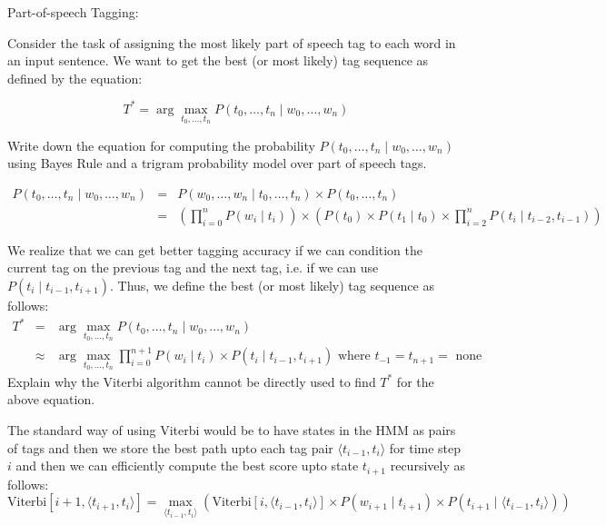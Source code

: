 \documentclass[11pt]{article}
\begin{document}
\begin{exe}
\begin{xlist}
\end{xlist}

\bigskip

\ex\label{trigram} Part-of-speech Tagging:

Consider the task of assigning the most
likely part of speech tag to each word in an input sentence. We want
to get the best (or most likely) tag sequence as defined by the
equation:

\[ T^\ast = \arg\max_{t_0, \ldots, t_n} P(t_0, \ldots, t_n \mid w_0,
\ldots, w_n) \]

\begin{xlist}

{\ex 
Write down the equation for computing the probability $P(t_0, \ldots,
t_n \mid w_0, \ldots, w_n)$ using Bayes Rule and a 
trigram probability model over part of speech tags.

\begin{soln}
 \begin{eqnarray}
 P(t_0, \ldots, t_n \mid w_0, \ldots, w_n) &=& P(w_0, \ldots, w_n \mid
 t_0, \ldots, t_n) \times P(t_0, \ldots, t_n) \nonumber \\
 &=& \left( \prod_{i=0}^n P(w_i \mid t_i) \right) \times
      \left( P(t_0) \times P(t_1 \mid t_0) \times
        \prod_{i=2}^n P(t_i \mid t_{i-2}, t_{i-1}) \right)
      \nonumber
 \end{eqnarray}
\end{soln}
}

\bigskip

{\ex 
We realize that we can get better tagging accuracy if we can condition the current tag on
the previous tag and the next tag, i.e. if we can use $P(t_i \mid t_{i-1}, t_{i+1})$. 
Thus, we define the best (or most likely) tag sequence 
as follows:
\begin{eqnarray*}
T^\ast &=& \arg\max_{t_0, \ldots, t_n} P(t_0, \ldots, t_n \mid w_0,
\ldots, w_n) \\
&\approx& \arg\max_{t_0, \ldots, t_n} \prod_{i=0}^{n+1} P(w_i \mid t_i) \times P(t_i \mid t_{i-1}, t_{i+1})
\textrm{ where $t_{-1} = t_{n+1} = $ none }
\end{eqnarray*}
Explain why the Viterbi algorithm cannot be directly used to find $T^\ast$ for the above equation.

\begin{soln}
The standard way of using Viterbi would be to have states in the HMM as pairs of tags
and then we store the best path upto each tag pair 
$\langle t_{i-1}, t_i \rangle$ for time
step $i$ and then we can efficiently compute the best score upto state $t_{i+1}$ recursively as
follows: 
\[ \textrm{Viterbi}[i+1, \langle t_{i+1}, t_i \rangle] = \max_{\langle t_{i-1}, t_i \rangle} \left(
\textrm{Viterbi}[i, \langle t_{i-1}, t_{i} \rangle] \times P(w_{i+1} \mid t_{i+1}) \times P(t_{i+1} \mid \langle t_{i-1}, t_i \rangle) \right) \]


\end{soln}}
\end{xlist}
\end{exe}
\end{document}
